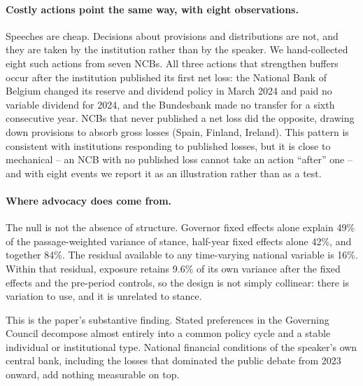 \documentclass[11pt]{article}
\theoremstyle{plain}
\begin{document}
\paragraph{Costly actions point the same way, with eight observations.}
Speeches are cheap. Decisions about provisions and distributions are not, and they are taken by the institution rather than by the speaker. We hand-collected eight such actions from seven NCBs. All three actions that strengthen buffers occur after the institution published its first net loss: the National Bank of Belgium changed its reserve and dividend policy in March 2024 and paid no variable dividend for 2024, and the Bundesbank made no transfer for a sixth consecutive year. NCBs that never published a net loss did the opposite, drawing down provisions to absorb gross losses (Spain, Finland, Ireland). This pattern is consistent with institutions responding to published losses, but it is close to mechanical -- an NCB with no published loss cannot take an action ``after'' one -- and with eight events we report it as an illustration rather than as a test.

\paragraph{Where advocacy does come from.}
The null is not the absence of structure. Governor fixed effects alone explain 49\% of the passage-weighted variance of stance, half-year fixed effects alone 42\%, and together 84\%. The residual available to any time-varying national variable is 16\%. Within that residual, exposure retains 9.6\% of its own variance after the fixed effects and the pre-period controls, so the design is not simply collinear: there is variation to use, and it is unrelated to stance.

This is the paper's substantive finding. Stated preferences in the Governing Council decompose almost entirely into a common policy cycle and a stable individual or institutional type. National financial conditions of the speaker's own central bank, including the losses that dominated the public debate from 2023 onward, add nothing measurable on top.
\end{document}

